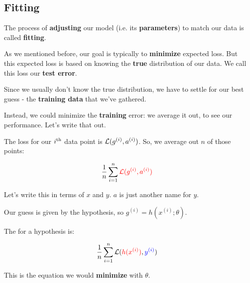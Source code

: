         
    \subsection{Fitting}
    
        The process of \textbf{adjusting} our model (i.e. its \textbf{parameters}) to match our data is called \textbf{fitting}.
        
        As we mentioned before, our goal is typically to \textbf{minimize} expected loss. But this expected loss is based on knowing the \textbf{true} distribution of our data. We call this loss our \textbf{test error}.
        
        Since we usually don't know the true distribution, we have to settle for our best guess - the \textbf{training data} that we've gathered. 
        
        Instead, we could minimize the \textbf{training} error: we average it out, to see our performance. Let's write that out.
        
        The loss for our $i^{ \text{th} }$ data point is $\mathcal{L}(g^{(i)},a^{(i)})$. So, we average out $n$ of those points:
        
        \begin{equation}
            \frac{1}{n}  \sum_{i=1}^n \textcolor{red}{ \mathcal{L}(  g^{(i)},  a^{(i)}  ) }
        \end{equation}
        
        Let's write this in terms of $x$ and $y$. $a$ is just another name for $y$. 
        
        Our guess is given by the hypothesis, so $g^{(i)} = h(x^{(i)};\theta)$.
        \\
        
        \begin{kequation}
            
            The  for a hypothesis is:
        
            \begin{equation*}
                \frac{1}{n}  \sum_{i=1}^n  \mathcal{L}( \textcolor{red}{ h( x^{(i)} ) }, \textcolor{blue}{ y^{(i)} }  ) 
            \end{equation*}
        
        \end{kequation}
        
        
        This is the equation we would \textbf{minimize} with $\theta$.
        
